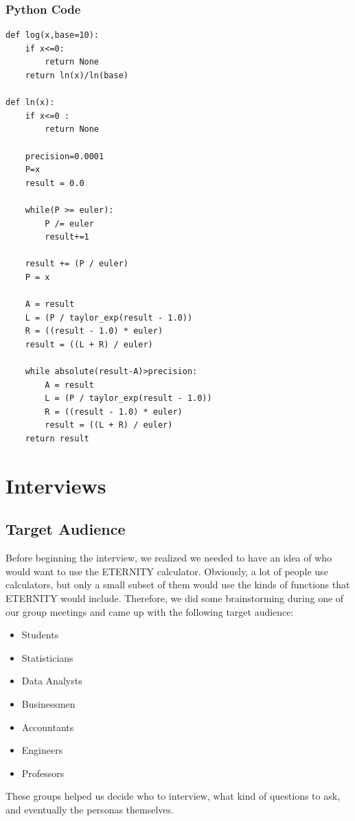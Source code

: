 \documentclass[11pt,onside]{report}
\begin{document}
\subsubsection{Python Code}
\begin{lstlisting}
def log(x,base=10):
    if x<=0:
        return None
    return ln(x)/ln(base)

def ln(x):
    if x<=0 :
        return None

    precision=0.0001
    P=x
    result = 0.0

    while(P >= euler):
        P /= euler
        result+=1

    result += (P / euler)
    P = x

    A = result
    L = (P / taylor_exp(result - 1.0))
    R = ((result - 1.0) * euler)
    result = ((L + R) / euler)

    while absolute(result-A)>precision:
        A = result
        L = (P / taylor_exp(result - 1.0))
        R = ((result - 1.0) * euler)
        result = ((L + R) / euler)
    return result
\end{lstlisting}

\section{Interviews}
\subsection{Target Audience}
Before beginning the interview, we realized we needed to have an idea of who would want to use the ETERNITY calculator. Obviously, a lot of people use calculators, but only a small subset of them would use the kinds of functions that ETERNITY would include. Therefore, we did some brainstorming during one of our group meetings and came up with the following target audience:
\begin{itemize}
    \item Students
    \item Statisticians
    \item Data Analysts
    \item Businessmen
    \item Accountants
    \item Engineers
    \item Professors
\end{itemize}
These groups helped us decide who to interview, what kind of questions to ask, and eventually the personas themselves.
\end{document}
